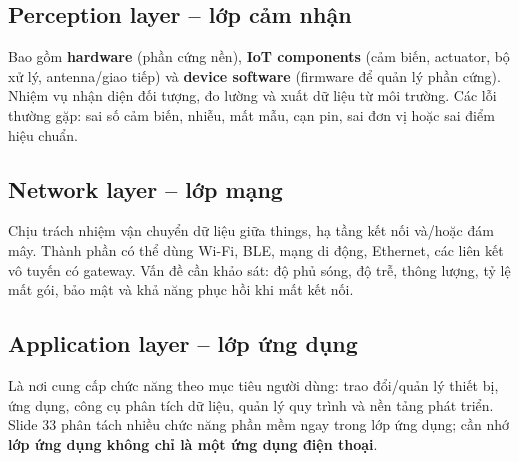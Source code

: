\subsection{Perception layer -- lớp cảm nhận}
Bao gồm \textbf{hardware} (phần cứng nền), \textbf{IoT components} (cảm biến, actuator, bộ xử lý, antenna/giao tiếp) và \textbf{device software} (firmware để quản lý phần cứng). Nhiệm vụ nhận diện đối tượng, đo lường và xuất dữ liệu từ môi trường. Các lỗi thường gặp: sai số cảm biến, nhiễu, mất mẫu, cạn pin, sai đơn vị hoặc sai điểm hiệu chuẩn.
\subsection{Network layer -- lớp mạng}
Chịu trách nhiệm vận chuyển dữ liệu giữa things, hạ tầng kết nối và/hoặc đám mây. Thành phần có thể dùng Wi-Fi, BLE, mạng di động, Ethernet, các liên kết vô tuyến có gateway. Vấn đề cần khảo sát: độ phủ sóng, độ trễ, thông lượng, tỷ lệ mất gói, bảo mật và khả năng phục hồi khi mất kết nối.
\subsection{Application layer -- lớp ứng dụng}
Là nơi cung cấp chức năng theo mục tiêu người dùng: trao đổi/quản lý thiết bị, ứng dụng, công cụ phân tích dữ liệu, quản lý quy trình và nền tảng phát triển. Slide 33 phân tách nhiều chức năng phần mềm ngay trong lớp ứng dụng; cần nhớ \textbf{lớp ứng dụng không chỉ là một ứng dụng điện thoại}.


